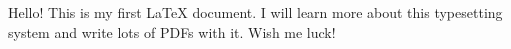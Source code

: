 \documentclass{article}
\begin{document}
	Hello! This is my first \LaTeX{} document. I will learn more about this typesetting system and write lots of PDFs with it. Wish me luck!
	
\end{document}
